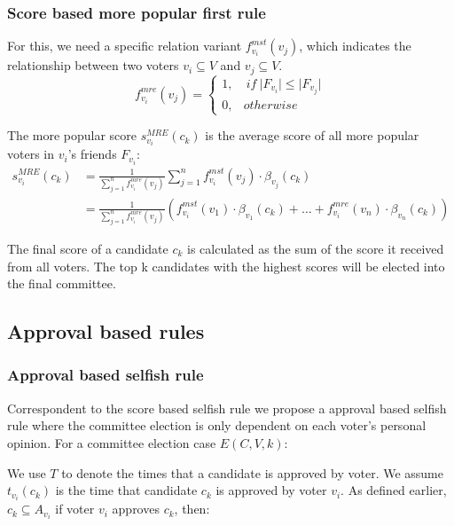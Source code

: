 \documentclass{article}
\begin{document}
\subsubsection{Score based more popular first rule}
For this, we need a specific relation variant $f_{v_i}^{mst}(v_j)$, which indicates the relationship between two voters $v_i\subseteq V$ and $v_j\subseteq V$. 
 \begin{equation}
 f_{v_i}^{mre}(v_j) =\begin{cases}
        1, &\: if \:  \vert F_{v_i}\vert\leqslant  \vert F_{v_j} \vert \\
        0, &otherwise
        \end{cases}\label{re:MRE}
\end{equation}

The more popular score $s_{v_i}^{MRE}(c_k)$ is the average score of all more popular voters in $v_i$'s friends $F_{v_i}$:
\begin{equation}
\begin{split}
s_{v_i}^{MRE}(c_k) &= \frac{1}{\sum_{j=1}^{n} f_{v_i}^{mre}(v_j)}\sum_{j=1}^{n} f_{v_i}^{mst}(v_j)\cdot \beta_{v_j}(c_k) \\
            &= \frac{1}{\sum_{j=1}^{n} f_{v_i}^{mre}(v_j)}(f_{v_i}^{mst}(v_1)\cdot \beta_{v_1}(c_k) + \dots + f_{v_i}^{mre}(v_n)\cdot \beta_{v_n}(c_k))\label{SB:MRE_singlevoter_Score}
\end{split}
\end{equation}

The final score of a candidate $c_k$ is calculated as the sum of the score it received from all voters. The top k candidates with the highest scores will be elected into the final committee.
\subsection{Approval based rules}
\subsubsection{Approval based selfish rule}
Correspondent to the score based selfish rule we propose a approval based selfish rule where the committee election is only dependent on each voter's personal opinion.  For a committee election case $E(C,V,k)$: 

We use $T$ to denote the times that a candidate is approved by voter. We assume $t_{v_i}(c_k)$ is the time that candidate $c_k$ is approved by voter $v_i$. As defined earlier, $c_k \subseteq A_{v_i}$ if voter $v_i$ approves $c_k$, then: 
\end{document}
